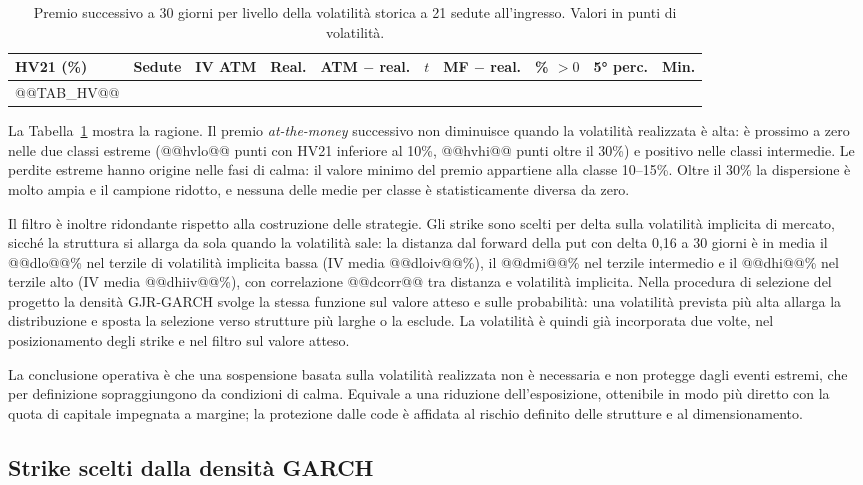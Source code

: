 \documentclass[11pt,a4paper]{article}
\begin{document}
\begin{table}[ht]\centering\small
\caption{Premio successivo a 30 giorni per livello della volatilità storica a 21 sedute all'ingresso. Valori in punti di volatilità.}\label{tab:hv}
\begin{tabular}{lrrrrrrrrr}\toprule
HV21 (\%) & Sedute & IV ATM & Real. & ATM $-$ real. & $t$ & MF $-$ real. & \% $>0$ & 5° perc. & Min. \\ \midrule
@@TAB_HV@@
\bottomrule\end{tabular}\end{table}

La Tabella~\ref{tab:hv} mostra la ragione. Il premio \emph{at-the-money} successivo non diminuisce quando la volatilità realizzata è alta: è prossimo a zero nelle due classi estreme (@@hvlo@@ punti con HV21 inferiore al 10\%, @@hvhi@@ punti oltre il 30\%) e positivo nelle classi intermedie. Le perdite estreme hanno origine nelle fasi di calma: il valore minimo del premio appartiene alla classe 10--15\%. Oltre il 30\% la dispersione è molto ampia e il campione ridotto, e nessuna delle medie per classe è statisticamente diversa da zero.

Il filtro è inoltre ridondante rispetto alla costruzione delle strategie. Gli strike sono scelti per delta sulla volatilità implicita di mercato, sicché la struttura si allarga da sola quando la volatilità sale: la distanza dal forward della put con delta 0{,}16 a 30 giorni è in media il @@dlo@@\% nel terzile di volatilità implicita bassa (IV media @@dloiv@@\%), il @@dmi@@\% nel terzile intermedio e il @@dhi@@\% nel terzile alto (IV media @@dhiiv@@\%), con correlazione @@dcorr@@ tra distanza e volatilità implicita. Nella procedura di selezione del progetto la densità GJR-GARCH svolge la stessa funzione sul valore atteso e sulle probabilità: una volatilità prevista più alta allarga la distribuzione e sposta la selezione verso strutture più larghe o la esclude. La volatilità è quindi già incorporata due volte, nel posizionamento degli strike e nel filtro sul valore atteso.

La conclusione operativa è che una sospensione basata sulla volatilità realizzata non è necessaria e non protegge dagli eventi estremi, che per definizione sopraggiungono da condizioni di calma. Equivale a una riduzione dell'esposizione, ottenibile in modo più diretto con la quota di capitale impegnata a margine; la protezione dalle code è affidata al rischio definito delle strutture e al dimensionamento.

\subsection{Strike scelti dalla densità GARCH}\label{sec:gstrike}
\end{document}
